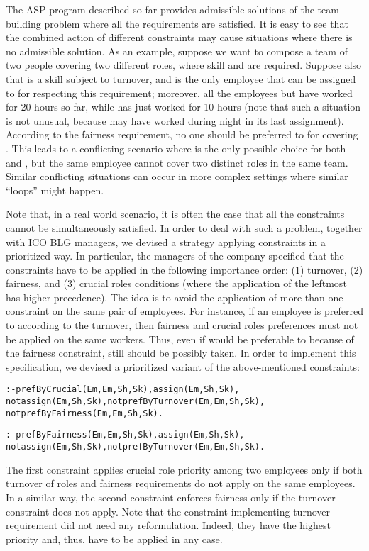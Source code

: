 \documentclass{tlp}
\begin{document}
The ASP program described so far provides admissible solutions of the team building problem
where all the requirements are satisfied.
It is easy to see that the combined action of different constraints
may cause situations where there is no admissible solution.
As an example, suppose we want to compose a team of two people covering two different roles,
where skill  and  are required. Suppose also that  is a skill subject to turnover,
and  is the only employee that can be assigned to  for respecting this requirement;
moreover, all the employees but  have worked for 20 hours so far,
while  has just worked for 10 hours (note that such a situation is not unusual,
because  may have worked during night in its last assignment).
According to the fairness requirement, no one should be preferred to  for covering .
This leads to a conflicting scenario where  is the only possible choice for both  and ,
but the same employee cannot cover two distinct roles in the same team.
Similar conflicting situations can occur in more complex settings where similar ``loops'' might happen.

Note that, in a real world scenario, it is often the case that
all the constraints cannot be simultaneously satisfied.
In order to deal with such a problem, together with ICO BLG managers, we devised a strategy applying
constraints in a prioritized way.
In particular, the managers of the company specified that the constraints
have to be applied in the following importance order:
(1) turnover, (2) fairness, and (3) crucial roles conditions
(where the application of the leftmost has higher precedence).
The idea is to avoid the application of more than one constraint on the same pair of employees.
For instance, if an employee  is preferred to  according to the turnover,
then fairness and crucial roles preferences must not be applied on the same workers.
Thus, even if  would be preferable to  because of the fairness constraint,
still  should be possibly taken.
In order to implement this specification,
we devised a prioritized variant of the above-mentioned constraints:
\begin{alltt}\small
 :- prefByCrucial(Em,Em,Sh,Sk), assign(Em,Sh,Sk),
    not assign(Em,Sh,Sk), not prefByTurnover(Em,Em,Sh,Sk),
    not prefByFairness(Em,Em,Sh,Sk).

 :- prefByFairness(Em,Em,Sh,Sk), assign(Em,Sh,Sk),
    not assign(Em,Sh,Sk), not prefByTurnover(Em,Em,Sh,Sk).
\end{alltt}\normalsize
The first constraint applies crucial role priority among two employees
only if both turnover of roles and fairness requirements do not apply on the same employees.
In a similar way, the second constraint enforces fairness only if the turnover constraint
does not apply.
Note that the constraint implementing turnover requirement did not need any reformulation.
Indeed, they have the highest priority and, thus, have to be applied in any case.
\end{document}
